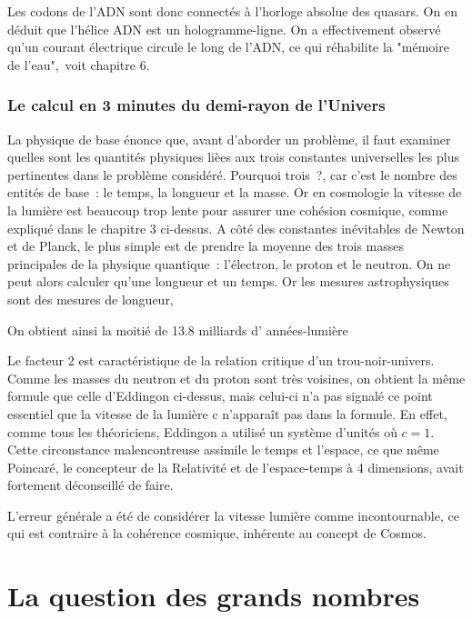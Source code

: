 \documentclass[a4paper,12pt]{article}
\begin{document}
Les codons de l'ADN sont donc connectés à l'horloge absolue des quasars. On en déduit que l'hélice ADN est un hologramme-ligne. On a effectivement observé qu'un courant électrique circule le long de l'ADN, ce qui réhabilite la "mémoire de l'eau", voit chapitre 6.




\subsubsection{Le calcul en 3 minutes du demi-rayon de l’Univers}

La physique de base énonce que, avant d’aborder un problème, il faut examiner quelles sont les quantités physiques lièes aux trois constantes universelles les plus pertinentes dans le problème considéré. Pourquoi trois ?, car c’est le nombre des entités de base : le  temps, la longueur et la masse. Or en cosmologie la vitesse de la lumière est beaucoup trop lente pour assurer une cohésion cosmique, comme expliqué dans le chapitre 3 ci-dessus. A côté des constantes inévitables de Newton et de Planck, le plus simple est de prendre la moyenne des trois masses principales de la physique quantique : l'électron, le proton et le neutron. On ne peut alors calculer qu’une longueur et un temps. Or les mesures astrophysiques sont des mesures de longueur, 


On obtient ainsi la moitié de 13.8 milliards d' années-lumière 


Le facteur 2 est caractéristique de la relation critique d’un trou-noir-univers. Comme  les masses du neutron et du proton sont très voisines, on obtient la même formule que celle d’Eddingon ci-dessus, mais celui-ci n’a pas signalé ce point essentiel que la vitesse de la lumière c n’apparaît pas dans la formule. En effet, comme tous les théoriciens, Eddingon a utilisé un système d’unités où $c = 1$. Cette circonstance malencontreuse assimile le temps et l’espace, ce que même Poincaré, le concepteur de la Relativité et de l’espace-temps à 4 dimensions, avait fortement déconseillé de faire.


L’erreur générale a été de considérer la vitesse lumière comme incontournable, ce qui est contraire à la cohérence cosmique, inhérente au concept de Cosmos.

 
\section{La question des grands nombres} 
\end{document}
